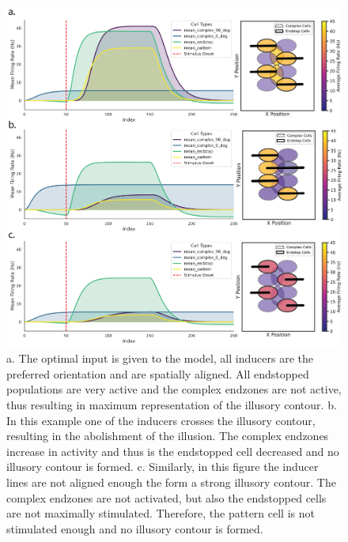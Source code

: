 \documentclass[12pt]{article}
\begin{document}
\begin{figure}[H]
  \centering
  \includegraphics[width=1.0 \textwidth]{figures/Figure_Population_configs.png}
  \caption{a. The optimal input is given to the model, all inducers are the preferred orientation and are spatially aligned. All endstopped populations are very active and the complex endzones are not active, thus resulting in maximum representation of the illusory contour. b. In this example one of the inducers crosses the illusory contour, resulting in the abolishment of the illusion. The complex endzones increase in activity and thus is the endstopped cell decreased and no illusory contour is formed. c. Similarly, in this figure the inducer lines are not aligned enough the form a strong illusory contour. The complex endzones are not activated, but also the endstopped cells are not maximally stimulated. Therefore, the pattern cell is not stimulated enough and no illusory contour is formed.}
  \label{fig:population_contours}
\end{figure}

\end{document}
